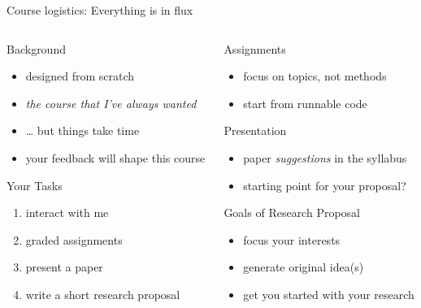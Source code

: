 \documentclass[aspectratio=169,mathserif]{beamer}
\begin{document}
\begin{frame}{Course logistics: Everything is in flux}
  \begin{columns}
    \begin{column}{0.5\linewidth}
      \begin{block}{Background}
        \begin{itemize}
        \item designed from scratch
        \item \emph{the course that I've always wanted}
        \item \dots{} but things take time
        \item your feedback will shape this course     
        \end{itemize}
      \end{block}
      \begin{block}{Your Tasks}
        \begin{enumerate}
        \item interact with me
        \item graded assignments
        \item present a paper
        \item write a short research proposal
        \end{enumerate}
      \end{block} 
    \end{column}
    \begin{column}{0.5\linewidth}
      \begin{block}{Assignments}
        \begin{itemize}
        \item focus on topics, not methods
        \item start from runnable code
        \end{itemize}
      \end{block}
      \begin{block}{Presentation}
        \begin{itemize}
        \item paper \emph{suggestions} in the syllabus
        \item starting point for your proposal?
        \end{itemize}
      \end{block}
      \begin{block}{Goals of Research Proposal}
        \begin{itemize}
        \item focus your interests
        \item generate original idea(s)
        \item get you started with your research
        \end{itemize} 
      \end{block}
    \end{column}
  \end{columns}


\end{frame}
\end{document}
